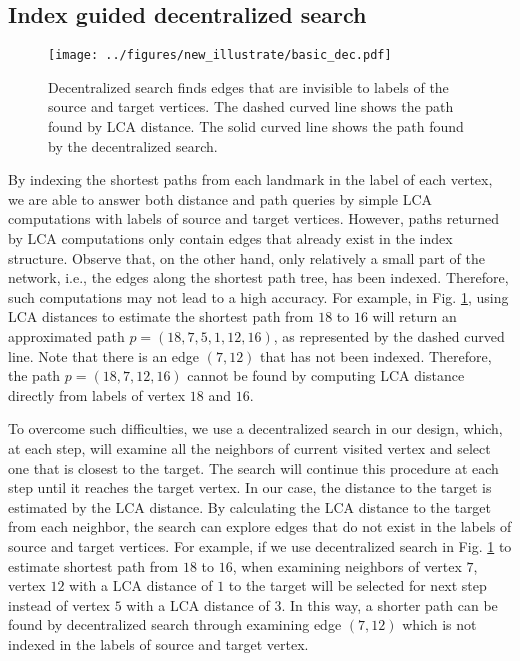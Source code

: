 \subsection{Index guided decentralized search}

\begin{figure}[t]
    \centering
    \texttt{[image: ../figures/new\_illustrate/basic\_dec.pdf]}
    \caption{Decentralized search finds edges that are invisible to labels of the source and target vertices. The dashed curved line shows the path found by LCA distance. The solid curved line shows the path found by the decentralized search.}
    \label{fig:basic_dec}
\end{figure}

By indexing the shortest paths from each landmark in the label of each vertex, we are able to answer both distance and path queries by simple LCA computations with labels of source and target vertices. However, paths returned by LCA computations only contain edges that already exist in the index structure. Observe that, on the other hand, only relatively a small part of the network, i.e., the edges along the shortest path tree, has been indexed. Therefore, such computations may not lead to a high accuracy. For example, in Fig. \ref{fig:basic_dec}, using LCA distances to estimate the shortest path from $18$ to $16$ will return an approximated path $p = (18, 7, 5, 1, 12, 16)$, as represented by the dashed curved line. Note that there is an edge $(7,12)$ that has not been indexed. Therefore, the path $p = (18,7,12,16)$ cannot be found by computing LCA distance directly from labels of vertex $18$ and $16$.

To overcome such difficulties, we use a decentralized search in our design, which, at each step, will examine all the neighbors of current visited vertex and select one that is closest to the target. The search will continue this procedure at each step until it reaches the target vertex. In our case, the distance to the target is estimated by the LCA distance. By calculating the LCA distance to the target from each neighbor, the search can explore edges that do not exist in the labels of source and target vertices. For example, if we use decentralized search in Fig. \ref{fig:basic_dec} to estimate shortest path from $18$ to $16$, when examining neighbors of vertex $7$, vertex $12$ with a LCA distance of $1$ to the target will be selected for next step instead of vertex $5$ with a LCA distance of $3$. In this way, a shorter path can be found by decentralized search through examining edge $(7,12)$ which is not indexed in the labels of source and target vertex.

